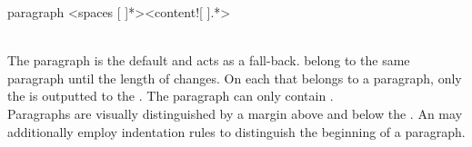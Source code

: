 \begin{identifier}{paragraph}
<spaces [ ]*><content![ ].*>
\end{identifier}
 \\

The paragraph is the default  and acts as a fall-back.  belong to the same paragraph until the length of  changes. On each  that belongs to a paragraph, only the  is outputted to the . The paragraph  can only contain . \\

Paragraphs are visually distinguished by a margin above and below the . An  may additionally employ indentation rules to distinguish the beginning of a paragraph.

